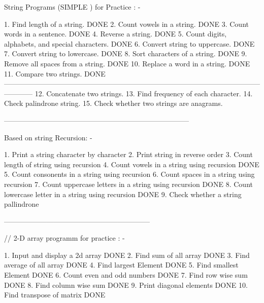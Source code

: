 String Programs (SIMPLE ) for Practice : -

1.	Find length of a string.                                                       DONE
2.	Count vowels in a string.                                                      DONE
3.	Count words in a sentence.                                                     DONE
4.	Reverse a string.                                                              DONE
5.	Count digits, alphabets, and special characters.                               DONE                           
6.	Convert string to uppercase.                                                   DONE
7.	Convert string to lowercase.                                                   DONE
8.	Sort characters of a string.                                                   DONE
9.	Remove all spaces from a string.                                               DONE
10. Replace a word in a string.                                                    DONE
11.	Compare two strings.                                                           DONE
------------------------------------------------------------------------------------------------------------------------
12.	Concatenate two strings. 
13. Find frequency of each character. 
14.	Check palindrone string. 
15.	Check whether two strings are anagrams.                                       

------------------------------------------------------------------------------

Based on string Recursion: -

1. Print a string character by character 
2. Print string in reverse order 
3. Count length of string using recursion
4. Count vowels in a string using recursion                                          DONE
5. Count consonents in a string using recursion 
6. Count spaces in a string using recursion 
7. Count uppercase letters in a string using recursion                               DONE
8. Count lowercase letter in a string using recursion                                DONE
9. Check whether a string pallindrone 

--------------------------------------------------------------

// 2-D array programm for practice : -

1. Input and display a 2d array                                                   DONE
2. Find sum of all array                                                          DONE
3. Find average of all array                                                      DONE
4. Find largest Element                                                           DONE
5. Find smallest Element                                                          DONE
6. Count even and odd numbers                                                     DONE
7. Find row wise sum                                                              DONE
8. Find column wise sum                                                           DONE
9. Print diagonal elements                                                        DONE
10. Find transpose of matrix                                                      DONE

